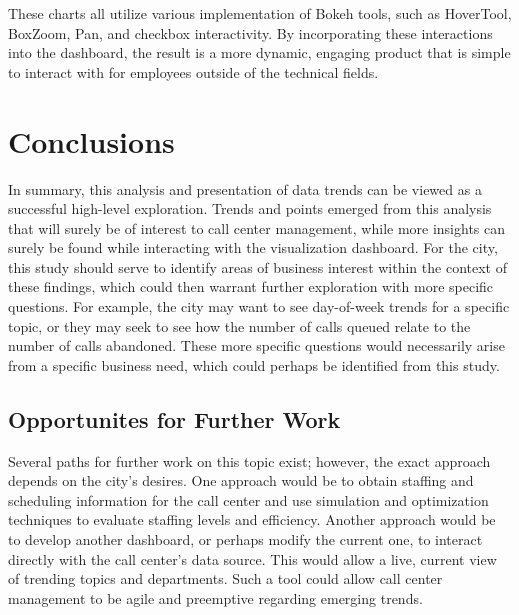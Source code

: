 \documentclass[11pt,twocolumn]{article}
\begin{document}
These charts all utilize various implementation of Bokeh tools, such as HoverTool, BoxZoom, Pan, and checkbox interactivity.  By incorporating these interactions into the dashboard, the result is a more dynamic, engaging product that is simple to interact with for employees outside of the technical fields.

\section{Conclusions}

In summary, this analysis and presentation of data trends can be viewed as a successful high-level exploration.  Trends and points emerged from this analysis that will surely be of interest to call center management, while more insights can surely be found while interacting with the visualization dashboard.  For the city, this study should serve to identify areas of business interest within the context of these findings, which could then warrant further exploration with more specific questions.  For example, the city may want to see day-of-week trends for a specific topic, or they may seek to see how the number of calls queued relate to the number of calls abandoned.  These more specific questions would necessarily arise from a specific business need, which could perhaps be identified from this study.

\subsection{Opportunites for Further Work}

Several paths for further work on this topic exist; however, the exact approach depends on the city's desires.  One approach would be to obtain staffing and scheduling information for the call center and use simulation and optimization techniques to evaluate staffing levels and efficiency.  Another approach would be to develop another dashboard, or perhaps modify the current one, to interact directly with the call center's data source.  This would allow a live, current view of trending topics and departments.  Such a tool could allow call center management to be agile and preemptive regarding emerging trends.
\end{document}
